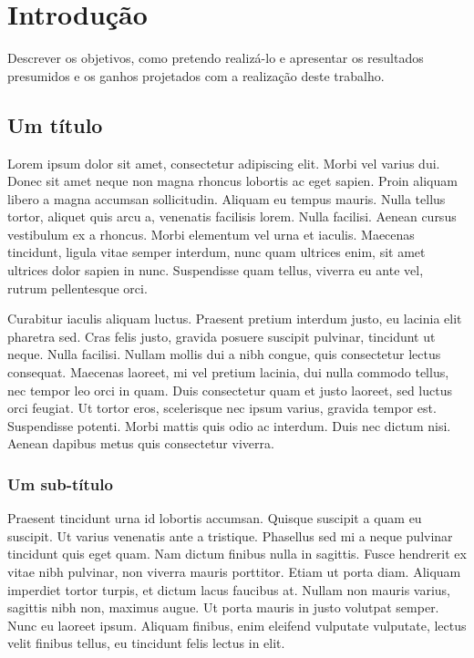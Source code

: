 \section{Introdução}\label{US9999:introducao}

\begin{displayquote}
    Descrever os objetivos, como pretendo realizá-lo e apresentar os resultados presumidos e os ganhos projetados com a realização deste trabalho.
\end{displayquote}

\subsection{Um título}

Lorem ipsum dolor sit amet, consectetur adipiscing elit. Morbi vel varius dui. Donec sit amet neque non magna rhoncus lobortis ac eget sapien. Proin aliquam libero a magna accumsan sollicitudin. Aliquam eu tempus mauris. Nulla tellus tortor, aliquet quis arcu a, venenatis facilisis lorem. Nulla facilisi. Aenean cursus vestibulum ex a rhoncus. Morbi elementum vel urna et iaculis. Maecenas tincidunt, ligula vitae semper interdum, nunc quam ultrices enim, sit amet ultrices dolor sapien in nunc. Suspendisse quam tellus, viverra eu ante vel, rutrum pellentesque orci.

Curabitur iaculis aliquam luctus. Praesent pretium interdum justo, eu lacinia elit pharetra sed. Cras felis justo, gravida posuere suscipit pulvinar, tincidunt ut neque. Nulla facilisi. Nullam mollis dui a nibh congue, quis consectetur lectus consequat. Maecenas laoreet, mi vel pretium lacinia, dui nulla commodo tellus, nec tempor leo orci in quam. Duis consectetur quam et justo laoreet, sed luctus orci feugiat. Ut tortor eros, scelerisque nec ipsum varius, gravida tempor est. Suspendisse potenti. Morbi mattis quis odio ac interdum. Duis nec dictum nisi. Aenean dapibus metus quis consectetur viverra.

\subsubsection{Um sub-título}

Praesent tincidunt urna id lobortis accumsan. Quisque suscipit a quam eu suscipit. Ut varius venenatis ante a tristique. Phasellus sed mi a neque pulvinar tincidunt quis eget quam. Nam dictum finibus nulla in sagittis. Fusce hendrerit ex vitae nibh pulvinar, non viverra mauris porttitor. Etiam ut porta diam. Aliquam imperdiet tortor turpis, et dictum lacus faucibus at. Nullam non mauris varius, sagittis nibh non, maximus augue. Ut porta mauris in justo volutpat semper. Nunc eu laoreet ipsum. Aliquam finibus, enim eleifend vulputate vulputate, lectus velit finibus tellus, eu tincidunt felis lectus in elit.

